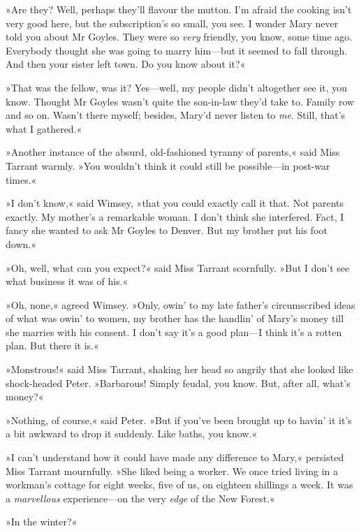 »Are they? Well, perhaps they'll flavour the mutton. I'm afraid the cooking isn't very good here, but the subscription's so small, you see.  I wonder Mary never told you about Mr Goyles. They were so \textit{very} friendly, you know, some time ago. Everybody thought she was going to marry him\allowbreak---\allowbreak but it seemed to fall through. And then your sister left town. Do you know about it?«

»That was the fellow, was it? Yes\allowbreak---\allowbreak well, my people didn't altogether see it, you know. Thought Mr Goyles wasn't quite the son-in-law they'd take to. Family row and so on. Wasn't there myself; besides, Mary'd never listen to \textit{me}. Still, that's what I gathered.«

»Another instance of the absurd, old-fashioned tyranny of parents,« said Miss Tarrant warmly. »You wouldn't think it could still be possible\allowbreak---\allowbreak in post-war times.«

»I don't know,« said Wimsey, »that you could exactly call it that. Not parents exactly. My mother's a remarkable woman. I don't think she interfered. Fact, I fancy she wanted to ask Mr Goyles to Denver. But my brother put his foot down.«

»Oh, well, what can you expect?« said Miss Tarrant scornfully. »But I don't see what business it was of his.«

»Oh, none,« agreed Wimsey. »Only, owin' to my late father's circumscribed ideas of what was owin' to women, my brother has the handlin' of Mary's money till she marries with his consent. I don't say it's a good plan\allowbreak---\allowbreak I think it's a rotten plan. But there it is.«

»Monstrous!« said Miss Tarrant, shaking her head so angrily that she looked like shock-headed Peter. »Barbarous! Simply feudal, you know.  But, after all, what's money?«

»Nothing, of course,« said Peter. »But if you've been brought up to havin' it it's a bit awkward to drop it suddenly. Like baths, you know.«

»I can't understand how it could have made any difference to Mary,« persisted Miss Tarrant mournfully. »She liked being a worker. We once tried living in a workman's cottage for eight weeks, five of us, on eighteen shillings a week. It was a \textit{marvellous} experience\allowbreak---\allowbreak on the very \textit{edge} of the New Forest.«

»In the winter?«

